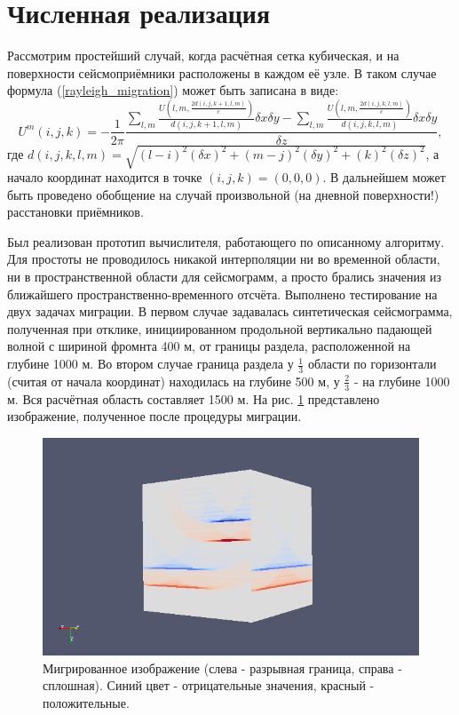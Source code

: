 \documentclass{article}
\begin{document}
\section{Численная реализация}

Рассмотрим простейший случай, когда расчётная сетка кубическая, и на поверхности сейсмоприёмники расположены в каждом её узле.
В таком случае формула (\ref{rayleigh_migration}) может быть записана в виде:
\begin{equation}
\label{rayleigh_migration_discrete}
U^m(i,j,k) = -\frac{1}{2\pi}\frac{\sum\limits_{l,m} \frac{U(l,m,\frac{2d(i,j,k+1,l,m)}{c})}{d(i,j,k+1,l,m)}\delta x \delta y - \sum\limits_{l,m} \frac{U(l,m,\frac{2d(i,j,k,l,m)}{c})}{d(i,j,k,l,m)}\delta x \delta y}{\delta z},
\end{equation}
где $d(i,j,k,l,m)=\sqrt{(l-i)^2(\delta x)^2 + (m-j)^2(\delta y)^2  + (k)^2(\delta z)^2}$, а начало координат находится в точке $(i,j,k)=(0,0,0)$.
В дальнейшем может быть проведено обобщение на случай произвольной (на дневной поверхности!) расстановки приёмников.

Был реализован прототип вычислителя, работающего по описанному алгоритму.
Для простоты не проводилось никакой интерполяции ни во временной области, ни в пространственной области для сейсмограмм, а просто брались значения из ближайшего пространственно-временного отсчёта.
Выполнено тестирование на двух задачах миграции.
В первом случае задавалась синтетическая сейсмограмма, полученная при отклике, инициированном продольной вертикально падающей волной с шириной фромнта 400 м, от границы раздела, расположенной на глубине 1000 м.
Во втором случае граница раздела у $\frac{1}{3}$ области по горизонтали (считая от начала координат) находилась на глубине 500 м, у $\frac{2}{3}$ - на глубине 1000 м.
Вся расчётная область составляет 1500 м.
На рис. \ref{layers_inverted} представлено изображение, полученное после процедуры миграции.
\begin{figure}[ht]
  \center
  \includegraphics[scale=0.5]{pic/layers_inverted.png}
  \caption{Мигрированное изображение (слева - разрывная граница, справа - сплошная). Синий цвет - отрицательные значения, красный - положительные.}
\label{layers_inverted}
\end{figure}
\end{document}
